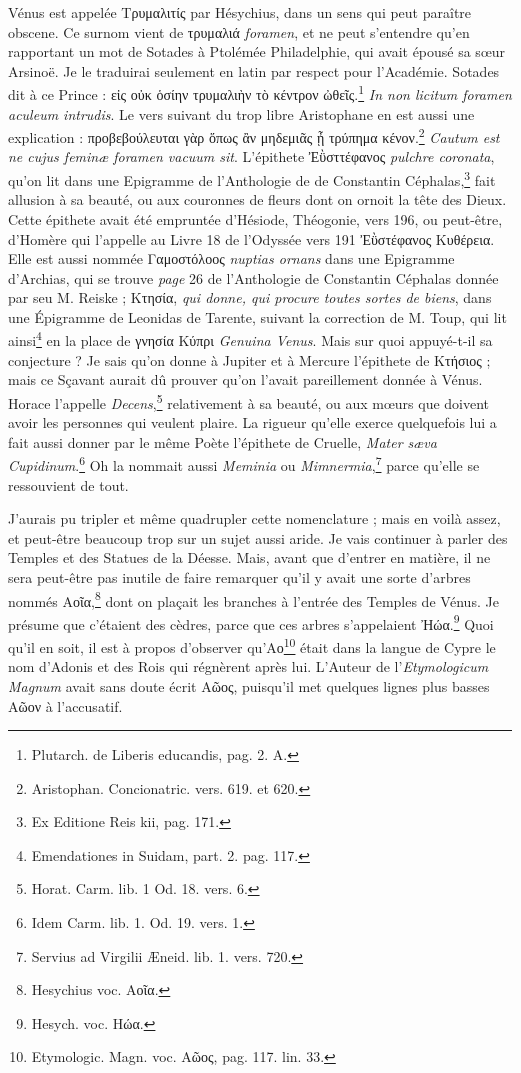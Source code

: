 \documentclass[a4paper, 18pt, oneside]{article}
\begin{document}
Vénus est appelée Τρυμαλιτίς par Hésychius, dans un sens qui peut paraître obscene. Ce surnom vient de τρυμαλιά \emph{foramen}, et ne peut s'entendre qu'en rapportant un mot de Sotades à Ptolémée Philadelphie, qui avait épousé sa sœur Arsinoë. Je le traduirai seulement en latin par respect pour l'Académie. Sotades dit à ce Prince : εἰς οὐκ ὁσίην τρυμαλιὴν τὸ κέντρον ὠθεῖς.\footnote{Plutarch. de Liberis educandis, pag. 2. A.} \emph{In non licitum foramen aculeum intrudis}. Le vers suivant du trop libre Aristophane en est aussi une explication : προβεβούλευται γὰρ ὅπως ἂν μηδεμιᾶς ᾖ τρύπημα κένον.\footnote{Aristophan. Concionatric. vers. 619. et 620.} \emph{Cautum est ne cujus feminæ foramen vacuum sit}. L'épithete Ἐῢσττέφανος \emph{pulchre coronata}, qu'on lit dans une Epigramme de l'Anthologie de de Constantin Céphalas,\footnote{Ex Editione Reis kii, pag. 171.} fait allusion à sa beauté, ou aux couronnes de fleurs dont on ornoit la tête des Dieux. Cette épithete avait été empruntée d'Hésiode, Théogonie, vers 196, ou peut-être, d'Homère qui l'appelle au Livre 18 de l'Odyssée vers 191 Ἐῢστέφανος Κυθέρεια. Elle est aussi nommée Γαμοστόλοος \emph{nuptias ornans} dans une Epigramme d'Archias, qui se trouve \emph{page} 26 de l'Anthologie de Constantin Céphalas donnée par seu M. Reiske ; Κτησία, \emph{qui donne, qui procure toutes sortes de biens}, dans une Épigramme de Leonidas de Tarente, suivant la correction de M. Toup, qui lit ainsi\footnote{Emendationes in Suidam, part. 2. pag. 117.} en la place de γνησία Κύπρι \emph{Genuina Venus}. Mais sur quoi appuyé-t-il sa conjecture ? Je sais qu'on donne à Jupiter et à Mercure l'épithete de Κτήσιος ; mais ce Sçavant aurait dû prouver qu'on l'avait pareillement donnée à Vénus. Horace l'appelle \emph{Decens},\footnote{Horat. Carm. lib. 1 Od. 18. vers. 6.} relativement à sa beauté, ou aux mœurs que doivent avoir les personnes qui veulent plaire. La rigueur qu'elle exerce quelquefois lui a fait aussi donner par le même Poète l'épithete de Cruelle, \emph{Mater sæva Cupidinum}.\footnote{Idem Carm. lib. 1. Od. 19. vers. 1.} Oh la nommait aussi \emph{Meminia} ou \emph{Mimnermia},\footnote{Servius ad Virgilii Æneid. lib. 1. vers. 720.} parce qu'elle se ressouvient de tout.

J'aurais pu tripler et même quadrupler cette nomenclature ; mais en voilà assez, et peut-être beaucoup trop sur un sujet aussi aride. Je vais continuer à parler des Temples et des Statues de la Déesse. Mais, avant que d'entrer en matière, il ne sera peut-être pas inutile de faire remarquer qu'il y avait une sorte d'arbres nommés Αοῖα,\footnote{Hesychius voc. Αοῖα.} dont on plaçait les branches à l'entrée des Temples de Vénus. Je présume que c'étaient des cèdres, parce que ces arbres s'appelaient Ἠώα.\footnote{Hesych. voc. Ηώα.} Quoi qu'il en soit, il est à propos d'observer qu'Αο\footnote{Etymologic. Magn. voc. Αῶος, pag. 117. lin. 33.} était dans la langue de Cypre le nom d'Adonis et des Rois qui régnèrent après lui. L'Auteur de l'\emph{Etymologicum Magnum} avait sans doute écrit Αῶος, puisqu'il met quelques lignes plus basses Αῶον à l'accusatif.
\end{document}
